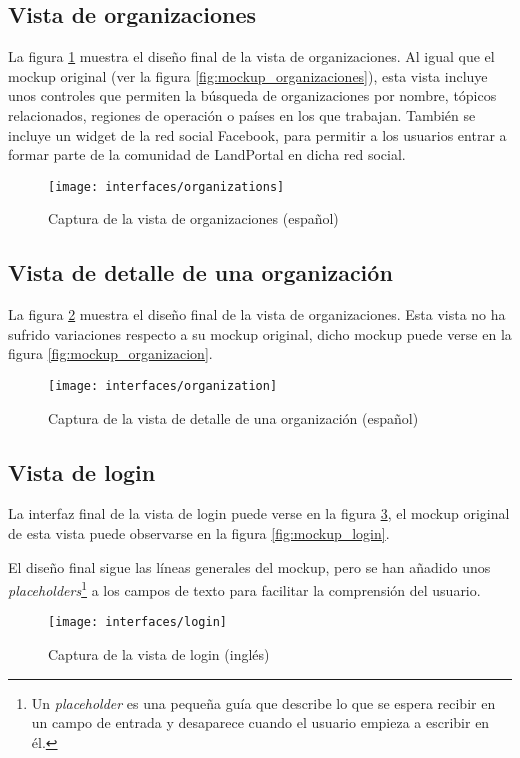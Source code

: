 \subsection{Vista de organizaciones}
La figura \ref{fig:interface_organizaciones} muestra el diseño final de la vista de organizaciones.  Al igual que el mockup original (ver la figura \ref{fig:mockup_organizaciones}), esta vista incluye unos controles que permiten la búsqueda de organizaciones por nombre, tópicos relacionados, regiones de operación o países en los que trabajan.  También se incluye un widget de la red social Facebook, para permitir a los usuarios entrar a formar parte de la comunidad de LandPortal en dicha red social.
\begin{figure}[h]
	\centering
	\texttt{[image: interfaces/organizations]}
	\caption{Captura de la vista de organizaciones (español)}
	\label{fig:interface_organizaciones}
\end{figure}


\subsection{Vista de detalle de una organización}
La figura \ref{fig:interface_organizacion} muestra el diseño final de la vista de organizaciones.  Esta vista no ha sufrido variaciones respecto a su mockup original, dicho mockup puede verse en la figura \ref{fig:mockup_organizacion}.
\begin{figure}[h]
	\centering
	\texttt{[image: interfaces/organization]}
	\caption{Captura de la vista de detalle de una organización (español)}
	\label{fig:interface_organizacion}
\end{figure}


\subsection{Vista de login}
La interfaz final de la vista de login puede verse en la figura \ref{fig:interface_login},  el mockup original de esta vista puede observarse en la figura \ref{fig:mockup_login}.  

El diseño final sigue las líneas generales del mockup, pero se han añadido unos \textit{placeholders}\footnote{Un \textit{placeholder} es una pequeña guía que describe lo que se espera recibir en un campo de entrada y desaparece cuando el usuario empieza a escribir en él.} a los campos de texto para facilitar la comprensión del usuario.
\begin{figure}[h]
	\centering
	\texttt{[image: interfaces/login]}
	\caption{Captura de la vista de login (inglés)}
	\label{fig:interface_login}
\end{figure}


